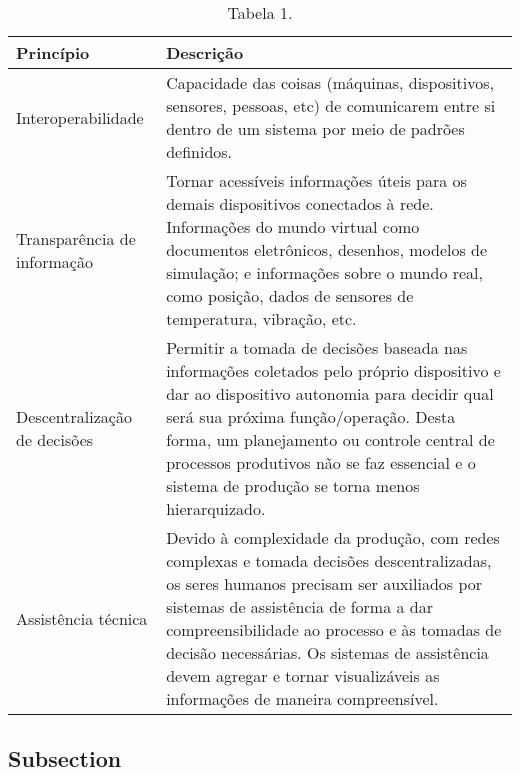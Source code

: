 \begin{table}[htb]
	\centering
	\footnotesize
	\begin{tabular}{p{3cm}p{12cm}}
		\hline
		\textbf{Princípio}           & \textbf{Descrição}                                                                                                                                                                                                                                                                                                           \\

		\hline
		Interoperabilidade           &
		Capacidade das coisas (máquinas, dispositivos, sensores, pessoas, etc) de comunicarem entre si dentro de um sistema por meio de padrões definidos.                                                                                                                                                                                                          \\

		\hline
		Transparência de informação  &
		Tornar acessíveis informações úteis para os demais dispositivos conectados à rede. Informações do mundo virtual como documentos eletrônicos, desenhos, modelos de simulação; e informações sobre o mundo real, como posição, dados de sensores de temperatura, vibração, etc.                                                                               \\

		\hline
		Descentralização de decisões &
		Permitir a tomada de decisões baseada nas informações coletados pelo próprio dispositivo e dar ao dispositivo autonomia para decidir qual será sua próxima função/operação. Desta forma, um planejamento ou controle central de processos produtivos não se faz essencial e o sistema de produção se torna menos hierarquizado.                             \\

		\hline
		Assistência técnica          &
		Devido à complexidade da produção, com redes complexas e tomada decisões descentralizadas, os seres humanos precisam ser auxiliados por sistemas de assistência de forma a dar compreensibilidade ao processo e às tomadas de decisão necessárias. Os sistemas de assistência devem agregar e tornar visualizáveis as informações de maneira compreensível. \\

		\hline
	\end{tabular}
	\caption{Tabela 1.}
	\label{tab:tabela1}
\end{table}

\subsection{Subsection }
\label{sub:rami4}

\lipsum